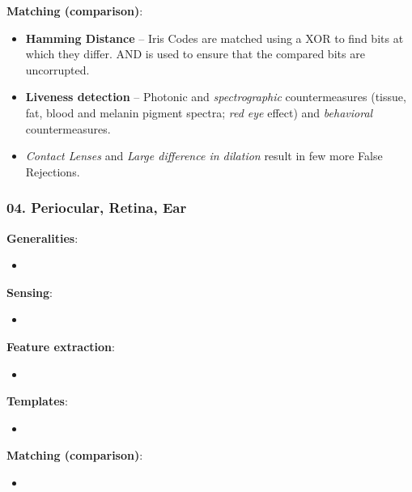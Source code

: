 \documentclass[a4paper]{article}
\begin{document}
      \textbf{Matching (comparison)}:
      \begin{itemize}
        \item \textbf{Hamming Distance} -- Iris Codes are matched using a XOR to find bits at which they differ. AND is used to ensure that the compared bits are uncorrupted.
        \item \textbf{Liveness detection} -- Photonic and \emph{spectrographic} countermeasures (tissue, fat, blood and melanin pigment spectra; \emph{red eye} effect) and \emph{behavioral} countermeasures.
        \item \emph{Contact Lenses} and \emph{Large difference in dilation} result in few more False Rejections.
      \end{itemize}
      \newpage
    \subsubsection*{04. Periocular, Retina, Ear}
      \textbf{Generalities}:
      \begin{itemize}
        \item 
      \end{itemize}

      \textbf{Sensing}:
      \begin{itemize}
        \item 
      \end{itemize}

      \textbf{Feature extraction}:
      \begin{itemize}
        \item 
      \end{itemize}

      \textbf{Templates}:
      \begin{itemize}
        \item 
      \end{itemize}

      \textbf{Matching (comparison)}:
      \begin{itemize}
        \item 
      \end{itemize}
    \newpage
\end{document}

